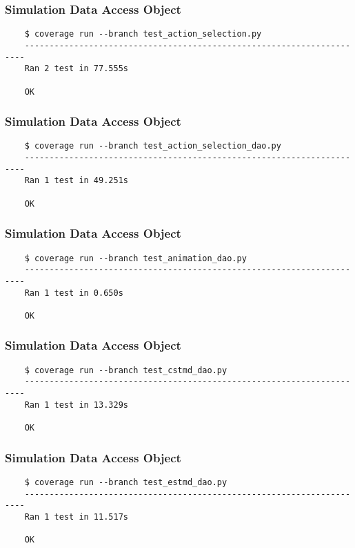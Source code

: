 \documentclass[a4paper,11pt]{article}
\begin{document}
\subsubsection*{{\hspace{6mm}}Simulation Data Access Object}
\begin{verbatim}
    $ coverage run --branch test_action_selection.py
    ----------------------------------------------------------------------
    Ran 2 test in 77.555s

    OK
\end{verbatim}

\subsubsection*{{\hspace{6mm}}Simulation Data Access Object}
\begin{verbatim}
    $ coverage run --branch test_action_selection_dao.py
    ----------------------------------------------------------------------
    Ran 1 test in 49.251s

    OK
\end{verbatim} 
    
\subsubsection*{{\hspace{6mm}}Simulation Data Access Object}
\begin{verbatim}
    $ coverage run --branch test_animation_dao.py
    ----------------------------------------------------------------------
    Ran 1 test in 0.650s

    OK
\end{verbatim}

\subsubsection*{{\hspace{6mm}}Simulation Data Access Object}
\begin{verbatim}
    $ coverage run --branch test_cstmd_dao.py
    ----------------------------------------------------------------------
    Ran 1 test in 13.329s

    OK
\end{verbatim}
  
\subsubsection*{{\hspace{6mm}}Simulation Data Access Object}
\begin{verbatim}
    $ coverage run --branch test_estmd_dao.py
    ----------------------------------------------------------------------
    Ran 1 test in 11.517s

    OK
\end{verbatim}  
\end{document}

